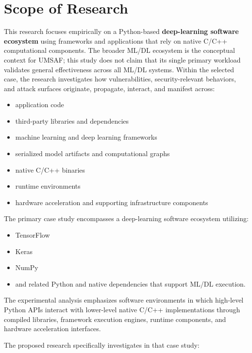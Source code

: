 \documentclass[
  12pt,
  letterpaper,
  oneside]{report}
\providecommand{\tightlist}{%
  \setlength{\itemsep}{0pt}\setlength{\parskip}{0pt}}
\begin{document}
\chapter{Scope of Research}\label{4-scope-of-research}

This research focuses empirically on a Python-based
\textbf{deep-learning software ecosystem} using frameworks and
applications that rely on native C/C++ computational components. The
broader ML/DL ecosystem is the conceptual context for UMSAF; this study
does not claim that its single primary workload validates general
effectiveness across all ML/DL systems. Within the selected case, the
research investigates how vulnerabilities, security-relevant behaviors,
and attack surfaces originate, propagate, interact, and manifest across:

\begin{itemize}
\tightlist
\item
  application code
\item
  third-party libraries and dependencies
\item
  machine learning and deep learning frameworks
\item
  serialized model artifacts and computational graphs
\item
  native C/C++ binaries
\item
  runtime environments
\item
  hardware acceleration and supporting infrastructure components
\end{itemize}

The primary case study encompasses a deep-learning software ecosystem
utilizing:

\begin{itemize}
\tightlist
\item
  TensorFlow
\item
  Keras
\item
  NumPy
\item
  and related Python and native dependencies that support ML/DL
  execution.
\end{itemize}

The experimental analysis emphasizes software environments in which
high-level Python APIs interact with lower-level native C/C++
implementations through compiled libraries, framework execution engines,
runtime components, and hardware acceleration interfaces.

The proposed research specifically investigates in that case study:
\end{document}

